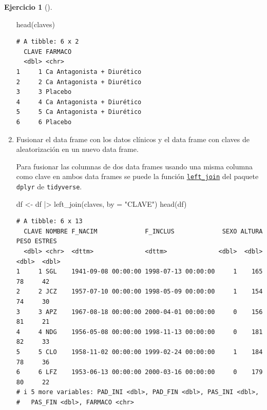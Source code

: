 \documentclass[
  a4paper,
]{scrreport}
\newenvironment{Shaded}{\begin{snugshade}}{\end{snugshade}}
\newcommand{\AttributeTok}[1]{\textcolor[rgb]{0.40,0.45,0.13}{#1}}
\newcommand{\FunctionTok}[1]{\textcolor[rgb]{0.28,0.35,0.67}{#1}}
\newcommand{\NormalTok}[1]{\textcolor[rgb]{0.00,0.23,0.31}{#1}}
\newcommand{\OtherTok}[1]{\textcolor[rgb]{0.00,0.23,0.31}{#1}}
\newcommand{\SpecialCharTok}[1]{\textcolor[rgb]{0.37,0.37,0.37}{#1}}
\newcommand{\StringTok}[1]{\textcolor[rgb]{0.13,0.47,0.30}{#1}}
\theoremstyle{definition}
\newtheorem{exercise}{Ejercicio}[chapter]
\theoremstyle{remark}
\begin{document}
\begin{exercise}[]
\begin{enumerate}
\begin{tcolorbox}
\begin{Shaded}
\begin{Highlighting}[]
\FunctionTok{head}\NormalTok{(claves)}
\end{Highlighting}
\end{Shaded}

\begin{verbatim}
# A tibble: 6 x 2
  CLAVE FARMACO                   
  <dbl> <chr>                     
1     1 Ca Antagonista + Diurético
2     2 Ca Antagonista + Diurético
3     3 Placebo                   
4     4 Ca Antagonista + Diurético
5     5 Ca Antagonista + Diurético
6     6 Placebo                   
\end{verbatim}

  \end{tcolorbox}
\item
  Fusionar el data frame con los datos clínicos y el data frame con
  claves de aleatorización en un nuevo data frame.

  \begin{tcolorbox}[enhanced jigsaw, breakable, toptitle=1mm, colbacktitle=quarto-callout-tip-color!10!white, rightrule=.15mm, opacityback=0, opacitybacktitle=0.6, titlerule=0mm, coltitle=black, colframe=quarto-callout-tip-color-frame, colback=white, bottomtitle=1mm, leftrule=.75mm, toprule=.15mm, title=\textcolor{quarto-callout-tip-color}{\faLightbulb}\hspace{0.5em}{Solución}, arc=.35mm, bottomrule=.15mm, left=2mm]

  Para fusionar las columnas de dos data frames usando una misma columna
  como clave en ambos data frames se puede la función
  \href{https://dtplyr.tidyverse.org/reference/left_join.dtplyr_step.html}{\texttt{left\_join}}
  del paquete \texttt{dplyr} de \texttt{tidyverse}.

\begin{Shaded}
\begin{Highlighting}[]
\NormalTok{df }\OtherTok{\textless{}{-}}\NormalTok{ df }\SpecialCharTok{|\textgreater{}} \FunctionTok{left\_join}\NormalTok{(claves, }\AttributeTok{by =} \StringTok{"CLAVE"}\NormalTok{)}
\FunctionTok{head}\NormalTok{(df)}
\end{Highlighting}
\end{Shaded}

\begin{verbatim}
# A tibble: 6 x 13
  CLAVE NOMBRE F_NACIM             F_INCLUS             SEXO ALTURA  PESO ESTRES
  <dbl> <chr>  <dttm>              <dttm>              <dbl>  <dbl> <dbl>  <dbl>
1     1 SGL    1941-09-08 00:00:00 1998-07-13 00:00:00     1    165    78     42
2     2 JCZ    1957-07-10 00:00:00 1998-05-09 00:00:00     1    154    74     30
3     3 APZ    1967-08-18 00:00:00 2000-04-01 00:00:00     0    156    81     21
4     4 NDG    1956-05-08 00:00:00 1998-11-13 00:00:00     0    181    82     33
5     5 CLO    1958-11-02 00:00:00 1999-02-24 00:00:00     1    184    78     36
6     6 LFZ    1953-06-13 00:00:00 2000-03-16 00:00:00     0    179    80     22
# i 5 more variables: PAD_INI <dbl>, PAD_FIN <dbl>, PAS_INI <dbl>,
#   PAS_FIN <dbl>, FARMACO <chr>
\end{verbatim}


\end{tcolorbox}
\end{enumerate}
\end{exercise}
\end{document}
